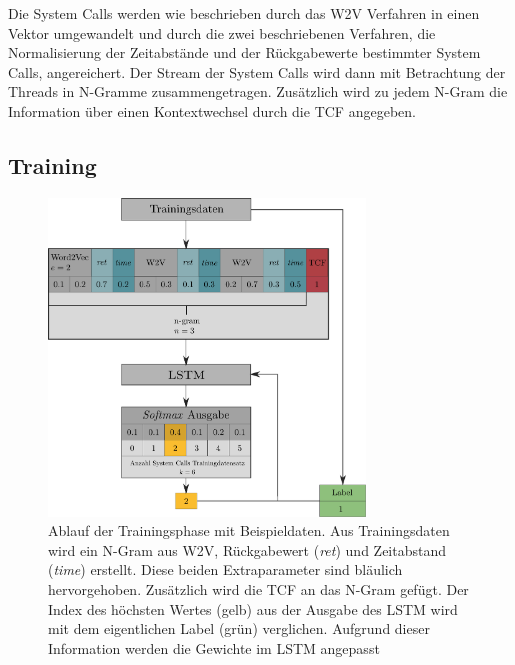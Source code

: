             Die System Calls werden wie  beschrieben durch das \ac{W2V} Verfahren in einen Vektor umgewandelt und durch die zwei  beschriebenen Verfahren, die Normalisierung der Zeitabstände und der Rückgabewerte bestimmter System Calls, angereichert.
            Der Stream der System Calls wird dann mit Betrachtung der Threads in N-Gramme zusammengetragen.
            Zusätzlich wird zu jedem N-Gram die Information über einen Kontextwechsel durch die \ac{TCF} angegeben.

        \subsection{Training}\label{sec:Training}
            \begin{figure}
                \centering
                \includegraphics[width=0.75\textwidth]{images/Process_overview.pdf}
                \caption[Algorithmus - Ablauf Trainingsphase]{Ablauf der Trainingsphase mit Beispieldaten.
                        Aus Trainingsdaten wird ein N-Gram aus \ac{W2V}, Rückgabewert (\textit{ret}) und Zeitabstand (\textit{time}) erstellt.
                        Diese beiden Extraparameter sind bläulich hervorgehoben.
                        Zusätzlich wird die \ac{TCF} an das N-Gram gefügt.
                        Der Index des höchsten Wertes (gelb) aus der Ausgabe des \ac{LSTM} wird mit dem eigentlichen Label (grün) verglichen.
                        Aufgrund dieser Information werden die Gewichte im \ac{LSTM} angepasst}\label{fig:training}
            \end{figure}
